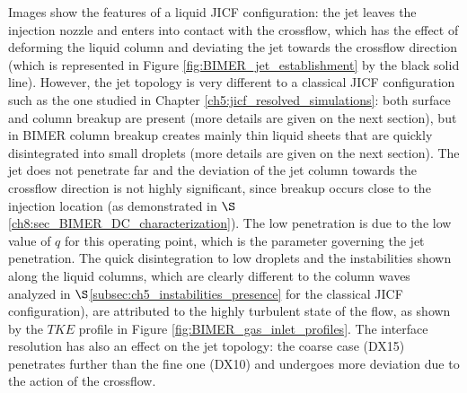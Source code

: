 Images show the features of a liquid JICF configuration: the jet leaves the injection nozzle and enters into contact with the crossflow, which has the effect of deforming the liquid column and deviating the jet towards the crossflow direction (which is represented in Figure \ref{fig:BIMER_jet_establishment} by the black solid line). However, the jet topology is very different to a classical JICF configuration such as the one studied in Chapter \ref{ch5:jicf_resolved_simulations}: both surface and column breakup are present (more details are given on the next section), but in BIMER column breakup creates mainly thin liquid sheets that are quickly disintegrated into small droplets (more details are given on the next section). The jet does not penetrate far and the deviation of the jet column towards the crossflow direction is not highly significant, since breakup occurs close to the injection location (as demonstrated in $\S$\ref{ch8:sec_BIMER_DC_characterization}). The low penetration is due to the low value of $q$ for this operating point, which is the parameter governing the jet penetration. The quick disintegration to low droplets and the instabilities shown along the liquid columns, which are clearly different to the column waves analyzed in $\S$\ref{subsec:ch5_instabilities_presence} for the classical JICF configuration), are attributed to the highly turbulent state of the flow, as shown by the $TKE$ profile in Figure \ref{fig:BIMER_gas_inlet_profiles}. The interface resolution has also an effect on the jet topology: the coarse case (DX15) penetrates further than the fine one (DX10) and undergoes more deviation due to the action of the crossflow. 




%



